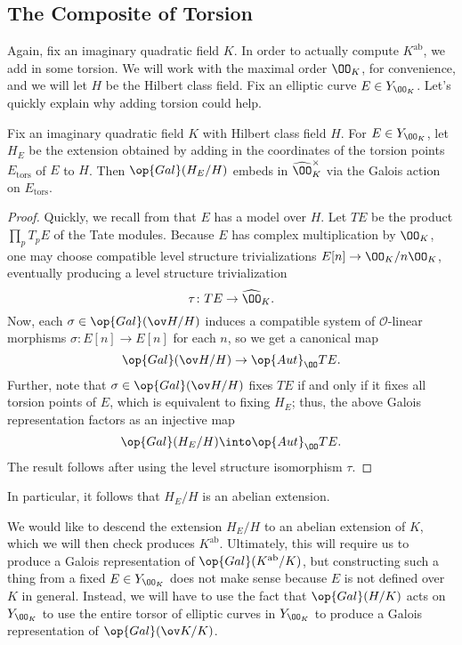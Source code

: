 \documentclass[../notes.tex]{subfiles}
\begin{document}
\subsection{The Composite of Torsion}
Again, fix an imaginary quadratic field $K$. In order to actually compute $K^{\mathrm{ab}}$, we add in some torsion. We will work with the maximal order $\OO_K$, for convenience, and we will let $H$ be the Hilbert class field. Fix an elliptic curve $E\in Y_{\OO_K}$. Let's quickly explain why adding torsion could help.
\begin{lemma}
	Fix an imaginary quadratic field $K$ with Hilbert class field $H$. For $E\in Y_{\OO_K}$, let $H_E$ be the extension obtained by adding in the coordinates of the torsion points $E_{\mathrm{tors}}$ of $E$ to $H$. Then $\op{Gal}(H_E/H)$ embeds in $\widehat\OO_K^\times$ via the Galois action on $E_{\mathrm{tors}}$.
\end{lemma}
\begin{proof}
	Quickly, we recall from  that $E$ has a model over $H$. Let $TE$ be the product $\prod_pT_pE$ of the Tate modules. Because $E$ has complex multiplication by $\OO_K$, one may choose compatible level structure trivializations $E[n]\to\OO_K/n\OO_K$, eventually producing a level structure trivialization
	\[\tau\colon TE\to\widehat\OO_K.\]
	Now, each $\sigma\in\op{Gal}(\ov H/H)$ induces a compatible system of $\mathcal O$-linear morphisms $\sigma\colon E[n]\to E[n]$ for each $n$, so we get a canonical map
	\[\op{Gal}(\ov H/H)\to\op{Aut}_\OO TE.\]
	Further, note that $\sigma\in\op{Gal}(\ov H/H)$ fixes $TE$ if and only if it fixes all torsion points of $E$, which is equivalent to fixing $H_E$; thus, the above Galois representation factors as an injective map
	\[\op{Gal}(H_E/H)\into\op{Aut}_\OO TE.\]
	The result follows after using the level structure isomorphism $\tau$.
\end{proof}
\begin{remark}
	In particular, it follows that $H_E/H$ is an abelian extension.
\end{remark}
We would like to descend the extension $H_E/H$ to an abelian extension of $K$, which we will then check produces $K^{\mathrm{ab}}$. Ultimately, this will require us to produce a Galois representation of $\op{Gal}(K^{\mathrm{ab}}/K)$, but constructing such a thing from a fixed $E\in Y_{\OO_K}$ does not make sense because $E$ is not defined over $K$ in general. Instead, we will have to use the fact that $\op{Gal}(H/K)$ acts on $Y_{\OO_K}$ to use the entire torsor of elliptic curves in $Y_{\OO_K}$ to produce a Galois representation of $\op{Gal}(\ov K/K)$.
\end{document}
